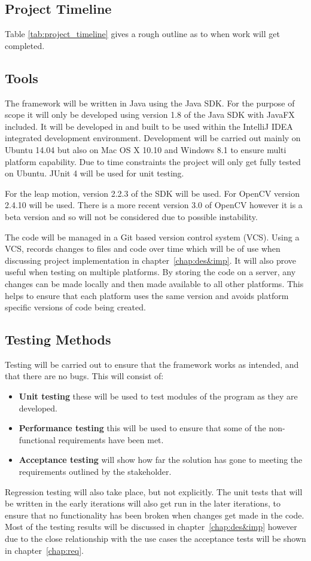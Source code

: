 \documentclass[11pt,oneside]{report}
\begin{document}
					\subsection{Project Timeline}
					Table \ref{tab:project_timeline} gives a rough outline as to when work will get completed.
					
			
			\subsection{Tools}
			The framework will be written in Java using the Java SDK.
			For the purpose of scope it will only be developed using version 1.8 of the Java SDK with JavaFX included.
			It will be developed in and built to be used within the IntelliJ IDEA integrated development environment.
			Development will be carried out mainly on Ubuntu 14.04 but also on Mac OS X 10.10 and Windows 8.1 to ensure multi platform capability.
			Due to time constraints the project will only get fully tested on Ubuntu.
			JUnit 4 will be used for unit testing.
			
			For the leap motion, version 2.2.3 of the SDK will be used.
			For OpenCV version 2.4.10 will be used.
			There is a more recent version 3.0 of OpenCV however it is a beta version and so will not be considered due to possible instability.
			
			The code will be managed in a Git based version control system (VCS).
			Using a VCS, records changes to files and code over time which will be of use when discussing project implementation in chapter~\ref{chap:des&imp}.
			It will also prove useful when testing on multiple platforms.
			By storing the code on a server, any changes can be made locally and then made available to all other platforms.
			This helps to ensure that each platform uses the same version and avoids platform specific versions of code being created.
			\subsection{Testing Methods}
				Testing will be carried out to ensure that the framework works as intended, and that there are no bugs.
				This will consist of:
				\begin{itemize}
					\item \textbf{Unit testing} these will be used to test modules of the program as they are developed.
					\item \textbf{Performance testing} this will be used to ensure that some of the non-functional requirements have been met.
					\item \textbf{Acceptance testing} will show how far the solution has gone to meeting the requirements outlined by the stakeholder.
				\end{itemize}
				Regression testing will also take place, but not explicitly.
				The unit tests that will be written in the early iterations will also get run in the later iterations, to ensure that no functionality has been broken when changes get made in the code.
				Most of the testing results will be discussed in chapter~\ref{chap:des&imp} however due to the close relationship with the use cases the acceptance tests will be shown in chapter~\ref{chap:req}.
				
\end{document}
